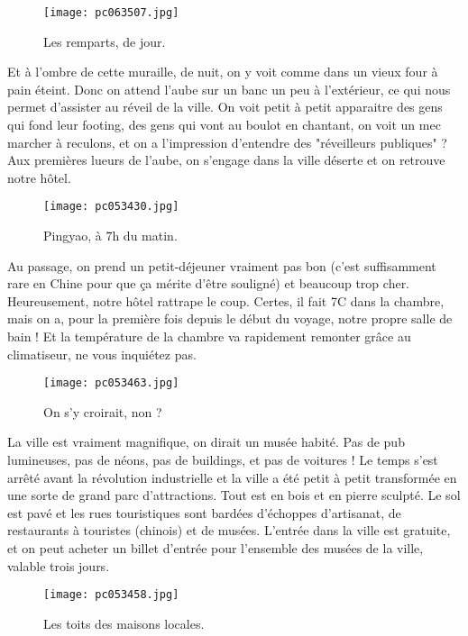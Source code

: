 \documentclass{book}
\begin{document}
\begin{figure}[h]
\centering
\texttt{[image: pc063507.jpg]}
\caption*{Les remparts, de jour.}
\end{figure}

Et à l'ombre de cette muraille, de nuit, on y voit comme dans un vieux four à pain éteint. Donc on attend l'aube sur un banc un peu à l'extérieur, ce qui nous permet d'assister au réveil de la ville. On voit petit à petit apparaitre des gens qui fond leur footing, des gens qui vont au boulot en chantant, on voit un mec marcher à reculons, et on a l'impression d'entendre des "réveilleurs publiques" ? Aux premières lueurs de l'aube, on s'engage dans la ville déserte et on retrouve notre hôtel.


\begin{figure}[h]
\centering
\texttt{[image: pc053430.jpg]}
\caption*{Pingyao, à 7h du matin.}
\end{figure}

Au passage, on prend un petit-déjeuner vraiment pas bon (c'est suffisamment rare en Chine pour que ça mérite d'être souligné) et beaucoup trop cher. Heureusement, notre hôtel rattrape le coup. Certes, il fait 7\textdegree C dans la chambre, mais on a, pour la première fois depuis le début du voyage, notre propre salle de bain ! Et la température de la chambre va rapidement remonter grâce au climatiseur, ne vous inquiétez pas.


\begin{figure}[h]
\centering
\texttt{[image: pc053463.jpg]}
\caption*{On s'y croirait, non ?}
\end{figure}

La ville est vraiment magnifique, on dirait un musée habité. Pas de pub lumineuses, pas de néons, pas de buildings, et pas de voitures ! Le temps s'est arrêté avant la révolution industrielle et la ville a été petit à petit transformée en une sorte de grand parc d'attractions. Tout est en bois et en pierre sculpté. Le sol est pavé et les rues touristiques sont bardées d'échoppes d'artisanat, de restaurants à touristes (chinois) et de musées. L'entrée dans la ville est gratuite, et on peut acheter un billet d'entrée pour l'ensemble des musées de la ville, valable trois jours.


\begin{figure}[h]
\centering
\texttt{[image: pc053458.jpg]}
\caption*{Les toits des maisons locales.}
\end{figure}
\end{document}
